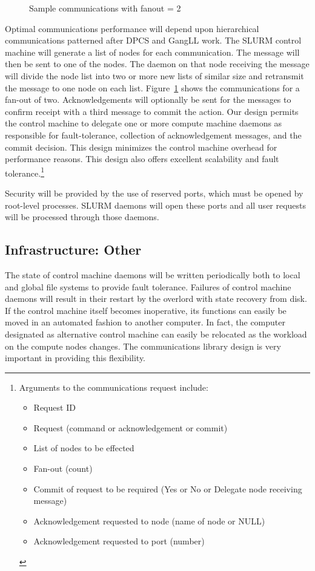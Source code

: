\begin{figure}[htb]
\centerline{}
\caption{Sample communications with fanout = 2}
\label{communicate}
\end{figure}
Optimal communications performance will depend upon hierarchical communications
patterned after DPCS and GangLL work. The SLURM control machine will generate a
list of nodes for each communication. The message will then be sent to one of
the nodes. 
The daemon on that node receiving the message will divide the node list into
two or more new lists of similar size and retransmit the message to one node on
each list. Figure~\ref{communicate} shows the communications for a fan-out of 
two.  Acknowledgements will optionally be sent for the messages to confirm 
receipt with a third message to commit the action. Our design permits the 
control machine to delegate one or more compute machine daemons as responsible 
for fault-tolerance, collection of acknowledgement messages, and the commit
decision. This design minimizes the control machine overhead for performance
reasons. This design also offers excellent scalability and fault 
tolerance.\footnote{Arguments to the communications request include:
\begin{itemize}
\item Request ID
\item Request (command or acknowledgement or commit)
\item List of nodes to be effected
\item Fan-out (count)
\item Commit of request to be required (Yes or No or Delegate node receiving
      message) 
\item Acknowledgement requested to node (name of node or NULL)
\item Acknowledgement requested to port (number)
\end{itemize} }

Security will be provided by the use of reserved ports, which must be opened by
root-level processes. SLURM daemons will open these ports and all user requests
will be processed through those daemons. 

\subsection{Infrastructure: Other}

The state of control machine daemons will be written periodically both to local
and global file systems to provide fault tolerance. Failures of control machine
daemons will result in their restart by the overlord with state recovery from
disk. If the control machine itself becomes inoperative, its functions can
easily be moved in an automated fashion to another computer. In fact, the
computer designated as alternative control machine can easily be relocated as
the workload on the compute nodes changes. The communications library design is
very important in providing this flexibility.


